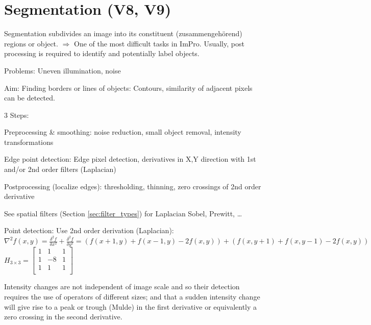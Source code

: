 \section{Segmentation (V8, V9)}
  Segmentation subdivides an image into its constituent (zusammengehörend) regions or object. 
  $\Rightarrow$ One of the most
  difficult tasks in ImPro. Usually, post processing is required to identify and potentially label
  objects.
  
  Problems: Uneven illumination, noise
  
    Aim: Finding borders or lines of objects: Contours, similarity of adjacent pixels can be detected.
    
    3 Steps:
    \begin{aufzaehlung}
      \item Preprocessing \& smoothing: noise reduction, small object removal, intensity transformations
      \item Edge point detection: Edge pixel detection, derivatives in X,Y direction with 1st and/or 2nd order filters (Laplacian)
      \item Postprocessing (localize edges): thresholding, thinning, zero crossings of 2nd order derivative
    \end{aufzaehlung}
    
      See spatial filters (Section \ref{sec:filter_types}) for Laplacian Sobel, Prewitt, \ldots
       
      Point detection: Use 2nd order derivation (Laplacian): 
      $\nabla^2 f(x,y) = \frac{\delta^2 f}{\delta x^2} + \frac{\delta^2f}{\delta y^2} = 
      \left(f(x+1,y)+f(x-1,y)-2f(x,y)\right) + \left(f(x,y+1)+f(x,y-1)-2f(x,y)\right)$
      $H_{3 \times 3} = \begin{bmatrix}
        1 & 1 & 1 \\
        1 & -8 & 1 \\
        1 & 1 & 1 \\
      \end{bmatrix}$
    
      Intensity changes are not
      independent of image scale and so their detection requires the use of operators of different
      sizes; and that a sudden intensity change will give rise to a peak or trough (Mulde) in the first 
      derivative or equivalently a zero crossing in the second derivative.
      
